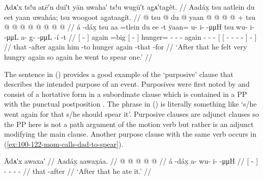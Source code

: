 \ex\label{ex:100-70-got-hungry-went-to-spear}%
%
\begingl
	\glpreamble	 Adᴀ′x ts!u aʟē′n duī′t yān uwaha′ ts!u wugū′t ag̣ᴀ′tag̣êt. //
	\glpreamble	Aadáx̱ tsu aatlein du eet yaan uwaháa; tsu woogoot ag̱ataag̱ít. //
	\gla	{}  @ {} {} 
		tsu  @ {}
		{} du  @ {} {}
		yaan @  @ {} @ {} @ {} +
		tsu  @ {} @ {} @ {}
		{} {}  @ {} @ {} @ {} @ {} @ {} {} {} {} //
	\glb	{} á -dáx̱ {}
		tsu aa =tlein
		{} du ee -t {} 
		ÿaan= u- i-  -μμH
		tsu wu- i-  -μμL
		{} {} a- {} g̱-  -μμL -í {} -t {} //
	\glc	{}[  - {}]
		again  =big 
		{}[   - {}]
		hunger= -  -  -
		again - -  -
		{}[ {}[ - \· -  - - {}] - {}] //
	\gld	{} that -after {}
		again  {}
		{} him {} -to {} 
		hunger  {} {} {}
		again  {} {} {}
		{} {}  {} {} {} {} -that {} -for {} //
	\glft	‘After that he felt very hungry again so again he went to spear one.’
		//
\endgl
\xe

The sentence in (\lastx) provides a good example of the ‘purposive’ clause that describes the intended purpose of an event.
Purposives were first noted by \textcite[106]{story:1966} and consist of a hortative form in a subordinate clause which is contained in a PP with the punctual postposition .
The phrase  in (\lastx) is literally something like ‘s/he went again for that s/he should spear it’.
Purposive clauses are adjunct clauses so the PP here is not a path argument of the motion verb but rather is an adjunct modifying the main clause.
Another purpose clause with the same verb occurs in (\ref{ex:100-122-mom-calls-dad-to-spear}).

\ex\label{ex:100-71-then-he-ate}%
%
\begingl
	\glpreamble	Ādᴀ′x awaxa′ //
	\glpreamble	Aadáx̱ aawax̱áa. //
	\gla	{}  @ {} {} 
		 @ {} @ {} @ {} @ {} //
	\glb	{} á -dáx̱ {} 
		a- wu- i-  -μμH //
	\glc	{}[  - {}]
		- - -  - //
	\gld	{} that -after {} 
		 {} {} {} {} //
	\glft	‘After that he ate it.’
		//
\endgl
\xe

